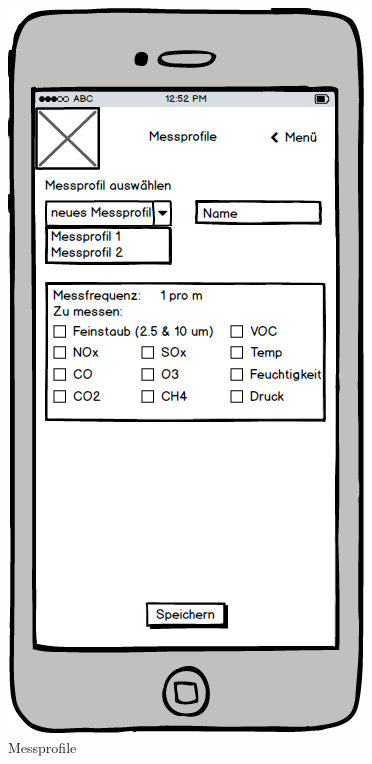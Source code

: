 \begin{figure}
	\centering
	\includegraphics[scale=0.8]{images/Messprofile}
	\caption{Messprofile}
\end{figure}
\newpage

